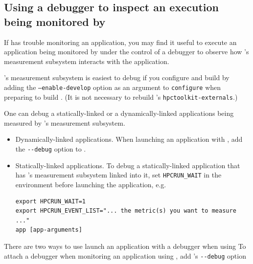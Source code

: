 \documentclass[11pt,twoside,letterpaper]{report}
\begin{document}
\subsection{Using a debugger to inspect an execution being monitored by \HPCToolkit{}}

If \HPCToolkit{} has trouble monitoring an application, you may find it useful to
execute an application being monitored by \HPCToolkit{} under the control
of a debugger to observe how \HPCToolkit{}'s measurement subsystem interacts with the application.

\HPCToolkit{}'s measurement subsystem is easiest to debug if you configure and
build \HPCToolkit{} by adding the \texttt{--enable-develop} option as an argument to \texttt{configure} when preparing to build \HPCToolkit{}.
(It is not necessary to rebuild \HPCToolkit{}'s \verb|hpctoolkit-externals|.)
%

One can debug a statically-linked or a dynamically-linked applications being measured by
\HPCToolkit{}'s measurement subsystem.
\begin{itemize}
\item Dynamically-linked applications. When launching an application with \hpcrun{}, add the \verb|--debug| option to \hpcrun{}.
\item Statically-linked applications. To debug a statically-linked application that has \HPCToolkit{}'s measurement subsystem linked into it, set \verb|HPCRUN_WAIT| in the environment before launching the application, e.g.
\begin{verbatim}
export HPCRUN_WAIT=1
export HPCRUN_EVENT_LIST="... the metric(s) you want to measure ..."
app [app-arguments]
\end{verbatim}
\end{itemize}

There are two ways to use launch an application with a debugger when using
To attach a debugger when monitoring an application using \hpcrun{}, add \hpcrun{}'s \verb|--debug| option
\end{document}
